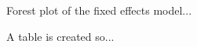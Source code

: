 \documentclass[11pt, a4paper]{article}
\begin{document}



Forest plot of the fixed effects model...






A table is created so...
\captionsetup{width=0.6\textwidth}
\end{document}
